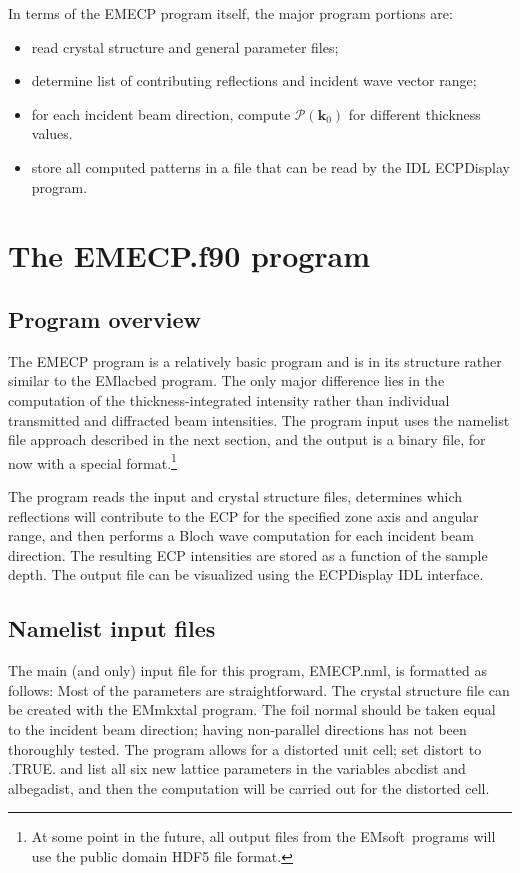 \documentclass[DIV=calc, paper=letter, fontsize=11pt]{scrartcl}	 %
\newcommand{\ctp}{\textsf{EMsoft}}
\begin{document}
In terms of the \textsf{EMECP} program itself, the major program portions are:
\begin{itemize}
	\item read crystal structure and general parameter files;
	\item determine list of contributing reflections and incident wave vector range;
	\item for each incident beam direction, compute $\mathcal{P}(\mathbf{k}_0)$ for 
	different thickness values.
	\item store all computed patterns in a file that can be read by the IDL \textsf{ECPDisplay} program.
\end{itemize}

\section{The \protect\textsf{EMECP.f90} program\label{sec:f90ecp}}

\subsection{Program overview\label{sec:f90overviewecp}}
The \textsf{EMECP} program is a relatively basic program and is in its structure rather similar to the \textsf{EMlacbed} program.
The only major difference lies in the computation of the thickness-integrated intensity rather than individual transmitted and 
diffracted beam intensities.  The program input uses the namelist file approach described in the next section, and the output is a 
binary file, for now with a special format.\footnote{At some point in the future, all output files from the \ctp\ programs will use
the public domain HDF5 file format.}  

The program reads the input and crystal structure files, determines which reflections will contribute to the ECP for the specified zone
axis and angular range, and then performs
a Bloch wave computation for each incident beam direction.  The resulting ECP intensities are stored as a function of the sample depth.
The output file can be visualized using the \textsf{ECPDisplay} IDL interface.

\subsection{Namelist input files\label{sec:f90inputecp}}
The main (and only) input file for this program, \textsf{EMECP.nml}, is formatted as follows:
Most of the parameters are straightforward.  The crystal structure file can be created with 
the \textsf{EMmkxtal} program.  The foil normal should be taken equal to the incident beam direction; having non-parallel 
directions has not been thoroughly tested.  The program allows for a distorted unit cell; set \textsf{distort} to \textsf{.TRUE.}
and list all six new lattice parameters in the variables \textsf{abcdist} and \textsf{albegadist}, and then the computation will
be carried out for the distorted cell.
\end{document}
